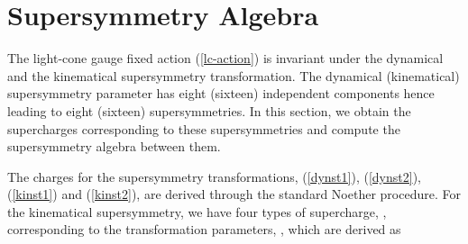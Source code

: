 \documentclass[a4paper,12pt]{article}
\begin{document}
\section{Supersymmetry Algebra}

The light-cone gauge fixed action (\ref{lc-action}) is invariant under
the dynamical and the kinematical supersymmetry transformation.  The
dynamical (kinematical) supersymmetry parameter has eight (sixteen)
independent components hence leading to eight (sixteen)
supersymmetries.  In this section, we obtain the supercharges
corresponding to these supersymmetries and compute the supersymmetry
algebra between them.

The charges for the supersymmetry transformations, (\ref{dynst1}),
(\ref{dynst2}), (\ref{kinst1}) and (\ref{kinst2}), are derived through
the standard Noether procedure.  For the kinematical supersymmetry, we
have four types of supercharge, \coordHE{}, corresponding
to the transformation parameters, \coordHE{}, which are
derived as
\end{document}
